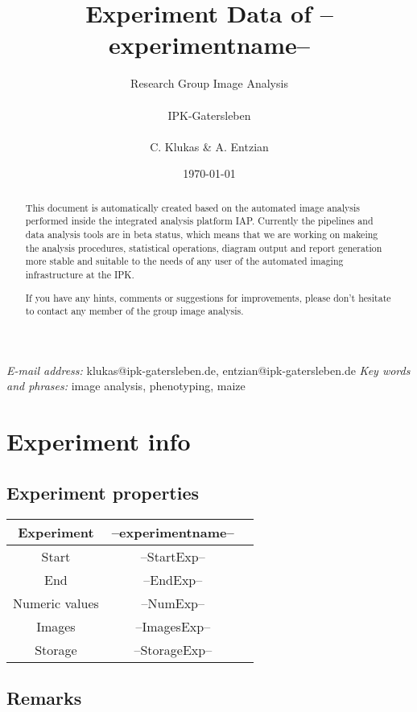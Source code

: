 \documentclass[%
  paper=a4, %
  pagesize, %
  DIV=calc, %
  headings=small,%
  english,   %
  oneside
]{scrartcl}  %
\providecommand{\tabularnewline}{\\}
\begin{document}
\title{Experiment Data of --experimentname--}
\author{Research Group Image Analysis\\ \\ IPK-Gatersleben\\ \\ C. Klukas \& A. Entzian}
\date{\today}

\maketitle  
\begin{abstract}
This document is automatically created based on the automated image analysis performed 
inside the integrated analysis platform IAP. Currently the pipelines and data analysis tools are in beta status, 
which means that we are working on makeing the analysis procedures, statistical operations, diagram output and report
generation more stable and suitable to the needs of any user of the automated imaging infrastructure at the IPK.

If you have any hints, comments or suggestions for improvements, please don't hesitate to contact any member
of the group image analysis.
\end{abstract}
\vfill
\small{\textit{E-mail address:} klukas@ipk-gatersleben.de, entzian@ipk-gatersleben.de}
\newline 
\small{\textit{Key words and phrases:} image analysis, phenotyping, maize }
 

\clearpage
\tableofcontents

\clearpage
\pagestyle{headings}
\section{Experiment info} 
\subsection{Experiment properties}


\begin{tabular}{|c|c|c|}
\hline 
Experiment & --experimentname--\tabularnewline
\hline 
\hline 
Start & --StartExp--\tabularnewline
\hline 
End & --EndExp--\tabularnewline
\hline 
Numeric values & --NumExp-- \tabularnewline
\hline 
Images & --ImagesExp-- \tabularnewline
\hline 
Storage & --StorageExp-- \tabularnewline
\hline 
\end{tabular}


\subsection{Remarks}
\end{document}
